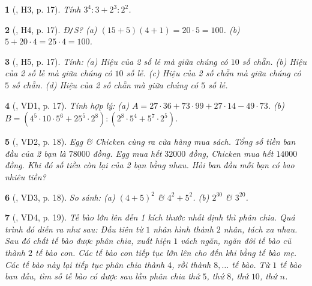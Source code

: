 \documentclass{article}
\newtheorem{baitoan}{}
\begin{document}
\begin{baitoan}[\cite{Binh_boi_duong_Toan_6_tap_1}, H3, p. 17]
	Tính $3^4:3 + 2^3:2^2$.
\end{baitoan}

\begin{baitoan}[\cite{Binh_boi_duong_Toan_6_tap_1}, H4, p. 17]
	{\rm Đ{\tt/}S?} (a) $(15 + 5)(4 + 1) = 20\cdot5 = 100$. (b) $5 + 20\cdot4 = 25\cdot4 = 100$.
\end{baitoan}

\begin{baitoan}[\cite{Binh_boi_duong_Toan_6_tap_1}, H5, p. 17]
	Tính: (a) Hiệu của 2 số lẻ mà giữa chúng có $10$ số chẵn. (b) Hiệu của 2 số lẻ mà giữa chúng có $10$ số lẻ. (c) Hiệu của 2 số chẵn mà giữa chúng có $5$ số chẵn. (d) Hiệu của 2 số chẵn mà giữa chúng có $5$ số lẻ.
\end{baitoan}

\begin{baitoan}[\cite{Binh_boi_duong_Toan_6_tap_1}, VD1, p. 17]
	Tính hợp lý: (a) $A = 27\cdot36 + 73\cdot99 + 27\cdot14 - 49\cdot73$. (b) $B = (4^5\cdot10\cdot5^6 + 25^5\cdot2^8):(2^8\cdot5^4 + 5^7\cdot2^5)$.
\end{baitoan}

\begin{baitoan}[\cite{Binh_boi_duong_Toan_6_tap_1}, VD2, p. 18]
	Egg \& Chicken cùng ra cửa hàng mua sách. Tổng số tiền ban đầu của 2 bạn là $78000$ đồng. Egg mua hết $32000$ đồng, Chicken mua hết $14000$ đồng. Khi đó số tiền còn lại của 2 bạn bằng nhau. Hỏi ban đầu mỗi bạn có bao nhiêu tiền?
\end{baitoan}

\begin{baitoan}[\cite{Binh_boi_duong_Toan_6_tap_1}, VD3, p. 18]
	So sánh: (a) $(4 + 5)^2$ \& $4^2 + 5^2$. (b) $2^{30}$ \& $3^{20}$.
\end{baitoan}

\begin{baitoan}[\cite{Binh_boi_duong_Toan_6_tap_1}, VD4, p. 19]
	Tế bào lớn lên đến 1 kích thước nhất định thì phân chia. Quá trình đó diễn ra như sau: Đầu tiên từ $1$ nhân hình thành $2$ nhân, tách xa nhau. Sau đó chất tế bào được phân chia, xuất hiện $1$ vách ngăn, ngăn đôi tế bào cũ thành $2$ tế bào con. Các tế bào con tiếp tục lớn lên cho đến khi bằng tế bào mẹ. Các tế bào này lại tiếp tục phân chia thành $4$, rồi thành $8,\ldots$ tế bào. Từ $1$ tế bào ban đầu, tìm số tế bào có được sau lần phân chia thứ $5$, thứ $8$, thứ $10$, thứ $n$.
\end{baitoan}
\end{document}
